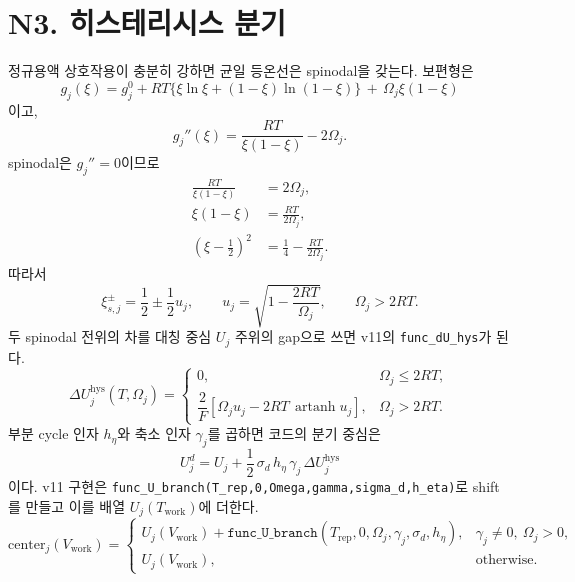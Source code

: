 \documentclass[11pt,a4paper]{article}
\newcommand{\hys}{\mathrm{hys}}
\newcommand{\work}{\mathrm{work}}
\newcommand{\artanh}{\operatorname{artanh}}
\begin{document}
\section{N3. 히스테리시스 분기}\label{sec:N3}
정규용액 상호작용이 충분히 강하면 균일 등온선은 spinodal을 갖는다. 보편형은
\begin{equation}
g_j(\xi)=g_j^0+RT\{\xi\ln\xi+(1-\xi)\ln(1-\xi)\}
\,+\,\Omega_j\xi(1-\xi)
\label{eq:gxi}
\end{equation}
이고,
\begin{equation}
g_j''(\xi)=\frac{RT}{\xi(1-\xi)}-2\Omega_j.
\label{eq:gpp}
\end{equation}
spinodal은 $g_j''=0$이므로
\begin{align}
\frac{RT}{\xi(1-\xi)}&=2\Omega_j,\label{eq:spinodalstep1}\\
\xi(1-\xi)&=\frac{RT}{2\Omega_j},\label{eq:spinodalstep2}\\
\left(\xi-\frac12\right)^2
&=\frac14-\frac{RT}{2\Omega_j}.
\label{eq:spinodalstep3}
\end{align}
따라서
\begin{equation}
\xi_{s,j}^{\pm}=\frac12\pm\frac12 u_j,\qquad
u_j=\sqrt{1-\frac{2RT}{\Omega_j}},\qquad \Omega_j>2RT.
\label{eq:spinodal}
\end{equation}
두 spinodal 전위의 차를 대칭 중심 $U_j$ 주위의 gap으로 쓰면 v11의 \texttt{func\_dU\_hys}가 된다.
\begin{equation}
\boxed{\;
\Delta U_j^{\hys}(T,\Omega_j)=
\begin{cases}
0,&\Omega_j\le2RT,\\[2pt]
\dfrac{2}{F}\left[\Omega_j u_j-2RT\,\artanh u_j\right],&\Omega_j>2RT.
\end{cases}
\;}
\label{eq:dUhys}
\end{equation}
부분 cycle 인자 $h_\eta$와 축소 인자 $\gamma_j$를 곱하면 코드의 분기 중심은
\begin{equation}
\boxed{\;U_j^d=U_j+\frac12\,\sigma_d\,h_\eta\,\gamma_j\,\Delta U_j^{\hys}\;}
\label{eq:Ubranch}
\end{equation}
이다. v11 구현은 \texttt{func\_U\_branch(T\_rep,0,Omega,gamma,sigma\_d,h\_eta)}로 shift를 만들고 이를 배열 $U_j(T_{\work})$에 더한다.
\begin{equation}
\mathrm{center}_j(V_{\work})=
\begin{cases}
U_j(V_{\work})+\texttt{func\_U\_branch}(T_{\mathrm{rep}},0,\Omega_j,\gamma_j,\sigma_d,h_\eta),
&\gamma_j\ne0,\ \Omega_j>0,\\
U_j(V_{\work}),&\text{otherwise}.
\end{cases}
\label{eq:centerdispatch}
\end{equation}
\end{document}
